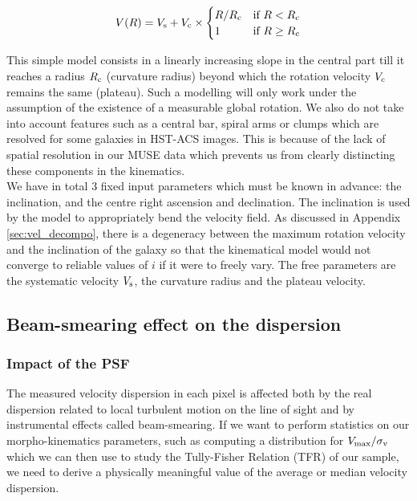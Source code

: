 \begin{equation}
	V(R) = V_{\rm{s}} + V_{\rm{c}}  \times
	\begin{cases}
 		R / R_{\rm{c}} &\mbox{if } R < R_{\rm{c}} \\
		1 &\mbox{if }  R \geq R_{\rm{c}}
	\end{cases}
\end{equation}

This simple model consists in a linearly increasing slope in the central part till it reaches a radius $R_{\rm{c}}$ (curvature radius) beyond which the rotation velocity $V_{\rm{c}}$ remains the same (plateau). Such a modelling will only work under the assumption of the existence of a measurable global rotation. We also do not take into account features such as a central bar, spiral arms or clumps which are resolved for some galaxies in HST-ACS images. This is because of the lack of spatial resolution in our MUSE data which prevents us from clearly distincting these components in the kinematics. \\

We have in total $3$ fixed input parameters which must be known in advance: the inclination, and the centre right ascension and declination. The inclination is used by the model to appropriately bend the velocity field. As discussed in Appendix \ref{sec:vel_decompo}, there is a degeneracy between the maximum rotation velocity and the inclination of the galaxy so that the kinematical model would not converge to reliable values of $i$ if it were to freely vary. The free parameters are the systematic velocity $V_{\rm{s}}$, the curvature radius and the plateau velocity. 


\newpage
\subsection{Beam-smearing effect on the dispersion}
\label{sec:beam_smearing_effect}
\subsubsection{Impact of the PSF}
\label{sec:impact_PSF}

The measured velocity dispersion in each pixel is affected both by the real dispersion related to local turbulent motion on the line of sight and by instrumental effects called beam-smearing. If we want to perform statistics on our morpho-kinematics parameters, such as computing a distribution for $V_{\rm{max}} / \sigma_{\rm{v}}$ which we can then use to study the Tully-Fisher Relation (TFR) of our sample, we need to derive a physically meaningful value of the average or median velocity dispersion. \\

